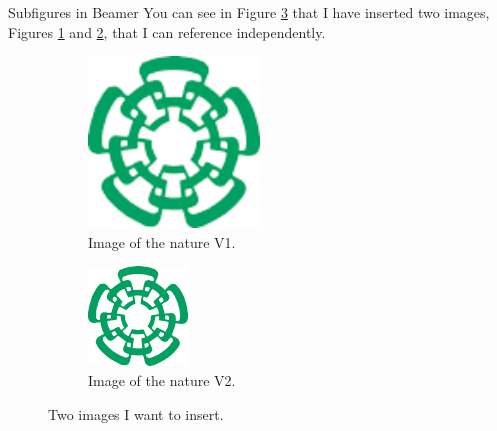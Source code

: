 \documentclass[
	11pt, %
]{beamer}
\begin{document}
\begin{frame}{Subfigures in Beamer}
  You can see in Figure \ref{fig:images} that I have inserted two images, Figures \ref{fig:nature1} and \ref{fig:nature2}, that I can reference independently.
  \begin{figure}
   \centering
    \begin{subfigure}[t]{0.4\textwidth}
      \includegraphics[width=0.5\textwidth]{cinvestavlogo}
      \caption{Image of the nature V1.}
      \label{fig:nature1}
    \end{subfigure}
    \begin{subfigure}[b]{0.4\textwidth}
      \includegraphics[width=\textwidth]{cinvestavlogo}
      \caption{Image of the nature V2.}
      \label{fig:nature2}
    \end{subfigure}
    \caption{Two images I want to insert.}
    \label{fig:images}
  \end{figure}
  \end{frame}
\end{document}
